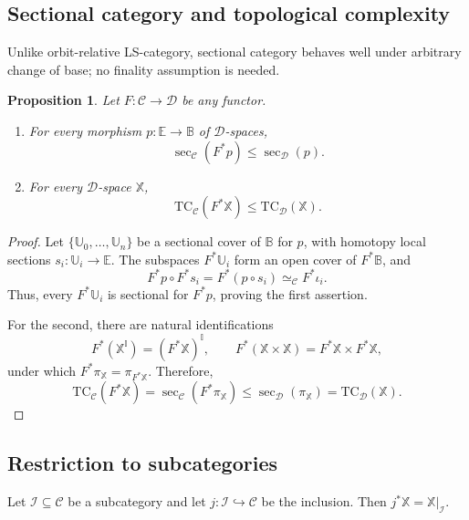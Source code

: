 \documentclass[12pt]{amsart}
\newtheorem{prop}[teo]{Proposition}
\theoremstyle{definition}
\theoremstyle{remark}
\numberwithin{figure}{section}%
\newcommand{\CC}{\mathcal{C}}
\newcommand{\TC}{\mathrm{TC}}
\newcommand{\Dc}{\mathcal{D}}
\newcommand{\X}{\mathbb{X}}
\newcommand{\Ee}{\mathbb{E}}
\newcommand{\Bb}{\mathbb{B}}
\newcommand{\Uu}{\mathbb{U}}
\begin{document}
\subsection{Sectional category and topological complexity}

Unlike orbit-relative LS-category, sectional category behaves well under
arbitrary change of base; no finality assumption is needed.

\begin{prop}
\label{prop:change-base-sectional}
\label{prop:change-base-path-space}
\label{thm:change-base-TC}
Let $F\colon\CC\to\Dc$ be any functor.
\begin{enumerate}
    \item For every morphism $p\colon\Ee\to\Bb$ of $\Dc$-spaces,
    \[
    \sec_{\CC}(F^*p)\leq\sec_{\Dc}(p).
    \]

    \item For every $\Dc$-space $\X$,
    \[
    \TC_{\CC}(F^*\X)\leq\TC_{\Dc}(\X).
    \]
\end{enumerate}
\end{prop}

\begin{proof}
Let $\{\Uu_0,\ldots,\Uu_n\}$ be a sectional cover of $\Bb$ for $p$,
with homotopy local sections $s_i\colon\Uu_i\to\Ee$. The subspaces
$F^*\Uu_i$ form an open cover of $F^*\Bb$, and
\[
F^*p\circ F^*s_i
=
F^*(p\circ s_i)
\simeq_{\CC}
F^*\iota_i.
\]
Thus, every $F^*\Uu_i$ is sectional for $F^*p$, proving the first
assertion.

For the second, there are natural identifications
\[
F^*(\X^{\mathbb I})=(F^*\X)^{\mathbb I},
\qquad
F^*(\X\times\X)=F^*\X\times F^*\X,
\]
under which $F^*\pi_{\X}=\pi_{F^*\X}$. Therefore,
\[
\TC_{\CC}(F^*\X)
=
\sec_{\CC}(F^*\pi_{\X})
\leq
\sec_{\Dc}(\pi_{\X})
=
\TC_{\Dc}(\X).
\]
\end{proof}

\subsection{Restriction to subcategories}

Let $\mathcal I\subseteq\CC$ be a subcategory and let
$j\colon\mathcal I\hookrightarrow\CC$ be the inclusion. Then
$j^*\X=\X|_{\mathcal I}$.
\end{document}

